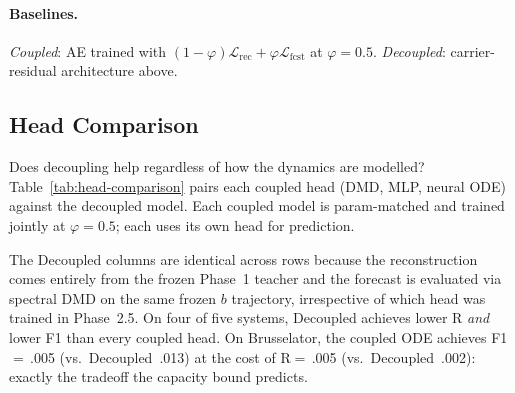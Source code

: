 \documentclass{article}
\begin{document}
\paragraph{Baselines.}
\emph{Coupled}: AE trained with
$(1{-}\varphi)\mathcal{L}_{\mathrm{rec}} +
\varphi\mathcal{L}_{\mathrm{fcst}}$ at $\varphi{=}0.5$.
\emph{Decoupled}: carrier-residual architecture above.


\subsection{Head Comparison}
\label{sec:head-comparison}

Does decoupling help regardless of how the dynamics are modelled?
Table~\ref{tab:head-comparison} pairs each coupled head (DMD,
MLP, neural ODE) against the decoupled model.  Each coupled model
is param-matched and trained jointly at $\varphi{=}0.5$; each uses
its own head for prediction.

The Decoupled columns are identical across rows because the
reconstruction comes entirely from the frozen Phase~1 teacher and the
forecast is evaluated via spectral DMD on the same frozen $b$
trajectory, irrespective of which head was trained in Phase~2.5.
On four of five systems, Decoupled achieves lower R \emph{and}
lower F1 than every coupled head.  On Brusselator, the coupled ODE
achieves F1$=$\,.005 (vs.\ Decoupled~.013) at the cost of
R$=$\,.005 (vs.\ Decoupled~.002): exactly the tradeoff the capacity
bound predicts.
\end{document}
